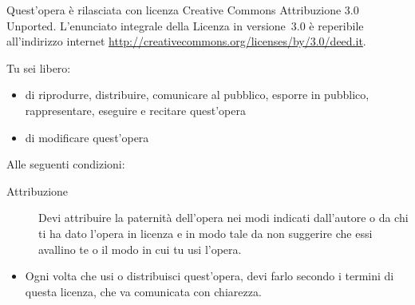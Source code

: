 \noindent Quest'opera è rilasciata con licenza Creative Commons Attribuzione 3.0 Unported. L'enunciato integrale della Licenza in versione~3.0 è reperibile all'indirizzo internet \url{http://creativecommons.org/licenses/by/3.0/deed.it}.

Tu sei libero:
\begin{itemize}
\item di riprodurre, distribuire, comunicare al pubblico, esporre in pubblico, rappresentare, eseguire e recitare quest'opera
\item di modificare quest'opera
\end{itemize}
Alle seguenti condizioni:
\begin{description}
\item[Attribuzione] Devi attribuire la paternità dell'opera nei modi indicati dall'autore o da chi ti ha dato l'opera in licenza e in modo tale da non suggerire che essi avallino te o il modo in cui tu usi l'opera.
\end{description}

\begin{itemize}
\item Ogni volta che usi o distribuisci quest'opera, devi farlo secondo i termini di questa licenza, che va comunicata con chiarezza.
\end{itemize}
